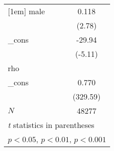 {\begin{tabular}{l*{1}{c}}
[1em]
male        &       0.118\sym{**} \\
            &      (2.78)         \\
[1em]
\_cons      &      -29.94\sym{***}\\
            &     (-5.11)         \\
\hline
rho         &                     \\
\_cons      &       0.770\sym{***}\\
            &    (329.59)         \\
\hline
\(N\)       &       48277         \\
\hline\hline
\multicolumn{2}{l}{\footnotesize \textit{t} statistics in parentheses}\\
\multicolumn{2}{l}{\footnotesize \sym{*} \(p<0.05\), \sym{**} \(p<0.01\), \sym{***} \(p<0.001\)}\\
\end{tabular}
}
